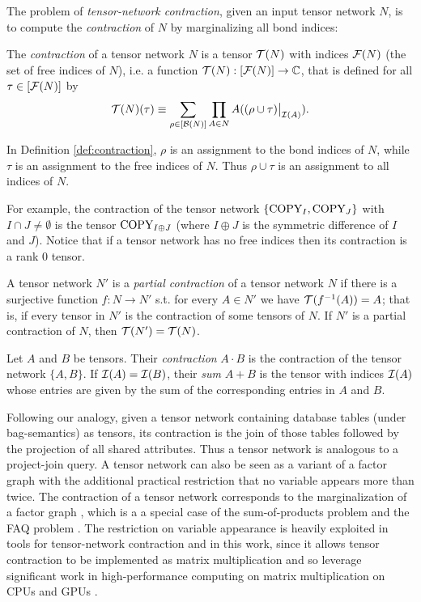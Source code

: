 The problem of \emph{tensor-network contraction}, given an input tensor network $N$, is to compute the \emph{contraction} of $N$ by marginalizing all bond indices:
\begin{definition}\label{def:contraction}
The \emph{contraction} of a tensor network $N$ is a tensor $\mathcal{T}(N)$ with indices $\mathcal{F}(N)$ (the set of free indices of $N$), i.e. a function $\mathcal{T}(N) : [\mathcal{F}(N)] \rightarrow \mathbb{C}$, that is defined for all $\tau \in [\mathcal{F}(N)]$ by
		\begin{equation}
        \mathcal{T}(N)(\tau) \equiv \sum_{\rho \in [\mathcal{B}(N)]} \prod_{A \in N} A((\rho \cup \tau)\big|_{\mathcal{I}(A)}).
        \end{equation}
\end{definition}

In Definition \ref{def:contraction}, $\rho$ is an assignment to the bond indices of $N$, while $\tau$ is an assignment to the free indices of $N$.
Thus $\rho \cup \tau$ is an assignment to all indices of $N$.

For example, the contraction of the tensor network $\{\text{COPY}_I, \text{COPY}_J\}$ with $I \cap J \neq \emptyset$ is the tensor $\text{COPY}_{I \oplus J}$ (where $I \oplus J$ is the symmetric difference of $I$ and $J$). Notice that if a tensor network has no free indices then its contraction is a rank 0 tensor. 

A tensor network $N'$ is a \emph{partial contraction} of a tensor network $N$ if there is a surjective function $f: N \rightarrow N'$ s.t. for every $A \in N'$ we have $\mathcal{T}(f^{-1}(A)) = A$; that is, if every tensor in $N'$ is the contraction of some tensors of $N$. If $N'$ is a partial contraction of $N$, then $\mathcal{T}(N') = \mathcal{T}(N)$.

Let $A$ and $B$ be tensors. Their \emph{contraction} $A \cdot B$ is the contraction of the tensor network $\{A, B\}$. If $\mathcal{I}(A) = \mathcal{I}(B)$, their \emph{sum} $A+B$ is the tensor with indices $\mathcal{I}(A)$ whose entries are given by the sum of the corresponding entries in $A$ and $B$.

Following our analogy, given a tensor network containing database tables (under bag-semantics) as tensors, its contraction is the join of those tables followed by the projection of all shared attributes. Thus a tensor network is analogous to a project-join query. A tensor network can also be seen as a variant of a factor graph \cite{KFL01} with the additional practical restriction that no variable appears more than twice. The contraction of a tensor network corresponds to the marginalization of a factor graph \cite{RS17}, which is a a special case of the sum-of-products problem \cite{BDP09,dechter99} and the FAQ problem \cite{KNR16}. The restriction on variable appearance is heavily exploited in tools for tensor-network contraction and in this work, since it allows tensor contraction to be implemented as matrix multiplication and so leverage significant work in high-performance computing on matrix multiplication on CPUs \cite{LHKK77} and GPUs \cite{FSH04}.
